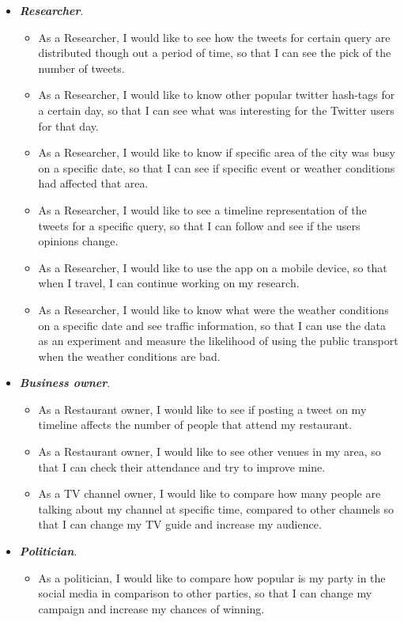 \documentclass{l4proj}
\begin{document}
\begin{itemize}%
	\item \textbf{\textit{Researcher}}.
	\begin{itemize}
		\item As a Researcher, I would like to see how the tweets for certain query are distributed though out a period of time, so that I can see the pick of the number of tweets.
		\item As a Researcher, I would like to know other popular twitter hash-tags for a certain day, so that I can see what was interesting for the Twitter users for that day.
		\item As a Researcher, I would like to know if specific area of the city was busy on a specific date, so that I can see if specific event or weather conditions had affected that area.
		\item As a Researcher, I would like to see a timeline representation of the tweets for a specific query, so that I can follow and see if the user\textquotesingle s opinions change.
		\item As a Researcher, I would like to use the app on a mobile device, so that when I travel, I can continue working on my research.
		\item As a Researcher, I would like to know what were the weather conditions on a specific date and see traffic information, so that I can use the data as an experiment and measure the likelihood of using the public transport when the weather conditions are bad. 
	\end{itemize}
	
	\item \textbf{\textit{Business owner}}.
	\begin{itemize}
		\item As a Restaurant owner, I would like to see if posting a tweet on my timeline affects the number of people that attend my restaurant.
		\item As a Restaurant owner, I would like to see other venues in my area, so that I can check their attendance and try to improve mine.
		\item As a TV channel owner, I would like to compare how many people are talking about my channel at specific time, compared to other channels so that I can change my TV guide and increase my audience.
	\end{itemize}
	
	\item \textbf{\textit{Politician}}.
	\begin{itemize}
		\item As a politician, I would like to compare how popular is my party in the social media in comparison to other parties, so that I can change my campaign and increase my chances of winning.
	\end{itemize}
	

\end{itemize}
\end{document}
